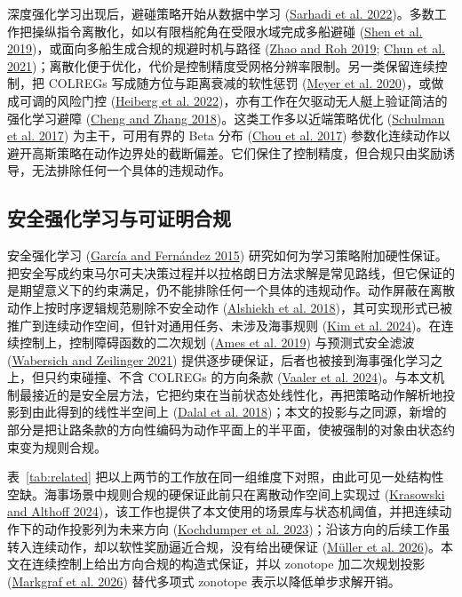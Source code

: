 \documentclass[12pt,letterpaper]{article}
\newcommand{\citl}[2]{(\hyperlink{ref:#1}{#2})}
\newcommand{\citm}[1]{(#1)}
\newcommand{\cl}[2]{\hyperlink{ref:#1}{#2}}
\begin{document}
深度强化学习出现后，避碰策略开始从数据中学习 \citl{sarhadi2022}{Sarhadi et al. 2022}。多数工作把操纵指令离散化，如以有限档舵角在受限水域完成多船避碰 \citl{shen2019}{Shen et al. 2019}，或面向多船生成合规的规避时机与路径 \citm{\cl{zhao2019}{Zhao and Roh 2019}; \cl{chun2021}{Chun et al. 2021}}；离散化便于优化，代价是控制精度受网格分辨率限制。另一类保留连续控制，把 COLREGs 写成随方位与距离衰减的软性惩罚 \citl{meyer2020}{Meyer et al. 2020}，或做成可调的风险门控 \citl{heiberg2022}{Heiberg et al. 2022}，亦有工作在欠驱动无人艇上验证简洁的强化学习避障 \citl{cheng2018}{Cheng and Zhang 2018}。这类工作多以近端策略优化 \citl{schulman2017}{Schulman et al. 2017} 为主干，可用有界的 Beta 分布 \citl{chou2017}{Chou et al. 2017} 参数化连续动作以避开高斯策略在动作边界处的截断偏差。它们保住了控制精度，但合规只由奖励诱导，无法排除任何一个具体的违规动作。



\subsection{安全强化学习与可证明合规}

安全强化学习 \citl{garca2015}{García and Fernández 2015} 研究如何为学习策略附加硬性保证。把安全写成约束马尔可夫决策过程并以拉格朗日方法求解是常见路线，但它保证的是期望意义下的约束满足，仍不能排除任何一个具体的违规动作。动作屏蔽在离散动作上按时序逻辑规范剔除不安全动作 \citl{alshiekh2018}{Alshiekh et al. 2018}，其可实现形式已被推广到连续动作空间，但针对通用任务、未涉及海事规则 \citl{kim2024}{Kim et al. 2024}。在连续控制上，控制障碍函数的二次规划 \citl{ames2019}{Ames et al. 2019} 与预测式安全滤波 \citl{wabersich2021}{Wabersich and Zeilinger 2021} 提供逐步硬保证，后者也被接到海事强化学习之上，但只约束碰撞、不含 COLREGs 的方向条款 \citl{vaaler2024}{Vaaler et al. 2024}。与本文机制最接近的是安全层方法，它把约束在当前状态处线性化，再把策略动作解析地投影到由此得到的线性半空间上 \citl{dalal2018}{Dalal et al. 2018}；本文的投影与之同源，新增的部分是把让路条款的方向性编码为动作平面上的半平面，使被强制的对象由状态约束变为规则合规。

表~\ref{tab:related} 把以上两节的工作放在同一组维度下对照，由此可见一处结构性空缺。海事场景中规则合规的硬保证此前只在离散动作空间上实现过 \citl{krasowski2024}{Krasowski and Althoff 2024}，该工作也提供了本文使用的场景库与状态机阈值，并把连续动作下的动作投影列为未来方向 \citl{kochdumper2023}{Kochdumper et al. 2023}；沿该方向的后续工作虽转入连续动作，却以软性奖励逼近合规，没有给出硬保证 \citl{mller2026}{Müller et al. 2026}。本文在连续控制上给出方向合规的构造式保证，并以 zonotope 加二次规划投影 \citl{markgraf2026}{Markgraf et al. 2026} 替代多项式 zonotope 表示以降低单步求解开销。
\end{document}
